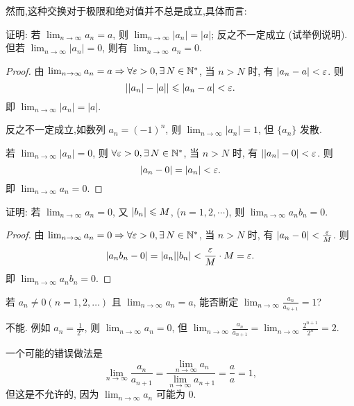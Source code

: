 然而,这种交换对于极限和绝对值并不总是成立,具体而言:
\begin{exercise}[1.2.4]
    证明: 若 $\lim_{n\to\infty} a_n = a$, 则 $\lim_{n\to\infty} |a_n| = |a|$; 反之不一定成立 (试举例说明). 但若 $\lim_{n\to\infty} |a_n| = 0$, 则有 $\lim_{n\to\infty} a_n = 0$.
\end{exercise}

\begin{proof}
    由 $\lim_{n\to\infty} a_n = a \Rightarrow \forall \ve > 0, \exists N \in \mathbb{N}^*$, 当 $n > N$ 时, 有 $|a_n - a| < \varepsilon$. 则
    $$
        ||a_n| - |a|| \leqslant |a_n - a| < \varepsilon.
    $$
    即 $\lim_{n\to\infty} |a_n| = |a|$.

    反之不一定成立,如数列 $a_n = (-1)^n$, 则 $\lim_{n\to\infty} |a_n| = 1$, 但 $\{a_n\}$ 发散.

    若 $\lim_{n\to\infty} |a_n| = 0$, 则 $\forall \ve > 0, \exists N \in \mathbb{N}^*$, 当 $n > N$ 时, 有 $||a_n| - 0| < \varepsilon$. 则
    $$
        |a_n - 0| = |a_n| < \varepsilon.
    $$
    即 $\lim_{n\to\infty} a_n = 0$.
\end{proof}

\begin{exercise}[1.2.5]
    证明: 若 $\lim_{n\to\infty} a_n = 0$, 又 $|b_n| \leqslant M$, ($n=1,2,\cdots$), 则 $\lim_{n\to\infty} a_n b_n = 0$.
\end{exercise}

\begin{proof}
    由 $\lim_{n\to\infty} a_n = 0 \Rightarrow \forall \ve > 0, \exists N \in \mathbb{N}^*$, 当 $n > N$ 时, 有 $|a_n - 0| < \frac{\varepsilon}{M}$. 则
    $$
        |a_n b_n - 0| = |a_n| |b_n| < \frac{\varepsilon}{M} \cdot M = \varepsilon.
    $$
    即 $\lim_{n\to\infty} a_n b_n = 0$.
\end{proof}

\begin{exercise}[1.2.9]
    若 $a_n \ne 0 (n=1, 2, \ldots)$ 且 $\lim_{n\to\infty} a_n = a$, 能否断定 $\lim_{n\to\infty} \frac{a_n}{a_{n+1}} = 1$?
\end{exercise}

\begin{solution}
    不能. 例如 $a_n = \frac{1}{2^n}$, 则 $\lim_{n\to\infty} a_n = 0$, 但 $\lim_{n\to\infty} \frac{a_n}{a_{n+1}} = \lim_{n\to\infty} \frac{2^{n+1}}{2^n} = 2$.

    一个可能的错误做法是$$\lim_{n\to\infty} \frac{a_n}{a_{n+1}} = \frac{\lim_{n\to\infty} a_n}{\lim_{n\to\infty} a_{n+1}} = \frac{a}{a} = 1,$$ 但这是不允许的, 因为 $\lim_{n\to\infty} a_n$ 可能为 $0$.
\end{solution}

